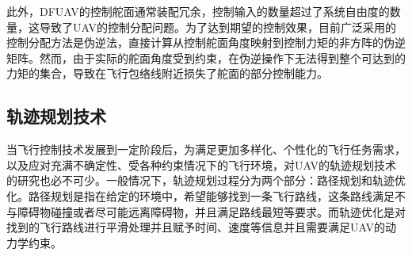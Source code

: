 此外，DFUAV的控制舵面通常装配冗余，控制输入的数量超过了系统自由度的数量，这导致了UAV的控制分配问题\cite{naldiPrototypeDuctedFanAerial2014b}。为了达到期望的控制效果，目前广泛采用的控制分配方法是伪逆法\cite{peddlePracticalHoverFlight2009a,pflimlinPositionControlDucted2007b,shengNearHoverAdaptiveAttitude2015b}，直接计算从控制舵面角度映射到控制力矩的非方阵的伪逆矩阵。然而，由于实际的舵面角度受到约束，在伪逆操作下无法得到整个可达到的力矩的集合\cite{durhamAircraftControlAllocation2017a}，导致在飞行包络线附近损失了舵面的部分控制能力\cite{HKXB202010026}。

\subsection{轨迹规划技术}

当飞行控制技术发展到一定阶段后，为满足更加多样化、个性化的飞行任务需求，以及应对充满不确定性、受各种约束情况下的飞行环境，对UAV的轨迹规划技术的研究也必不可少。一般情况下，轨迹规划过程分为两个部分：路径规划和轨迹优化。路径规划是指在给定的环境中，希望能够找到一条飞行路线，这条路线满足不与障碍物碰撞或者尽可能远离障碍物，并且满足路线最短等要求。而轨迹优化是对找到的飞行路线进行平滑处理并且赋予时间、速度等信息并且需要满足UAV的动力学约束。

